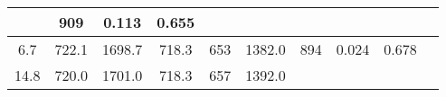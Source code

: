 \documentclass[a4paper,10pt]{article}
\begin{document}
\begin{longtable}{
     |
%    
    c|
%    
    c|
%    
    c|
%    
    c|
%    
    c|
%    
    c|
%    
    c|
%    
    c|
%    
    c|
%    
    c|
%    
    }
%        
        & 909
%        

%        

%        
        & 0.113
%        

%        

%        
        & 0.655
%        

%        
        \\
        \hline

        

%        

%        
        6.7
%        

%        

%        
        & 722.1
%        

%        

%        
        & 1698.7
%        

%        

%        
        & 718.3
%        

%        

%        
        & 653
%        

%        

%        
        & 1382.0
%        

%        

%        
        & 894
%        

%        

%        
        & 0.024
%        

%        

%        
        & 0.678
%        

%        
        \\
        \hline

        

%        

%        
        14.8
%        

%        

%        
        & 720.0
%        

%        

%        
        & 1701.0
%        

%        

%        
        & 718.3
%        

%        

%        
        & 657
%        

%        

%        
        & 1392.0
%        

%        


\end{longtable}
\end{document}
